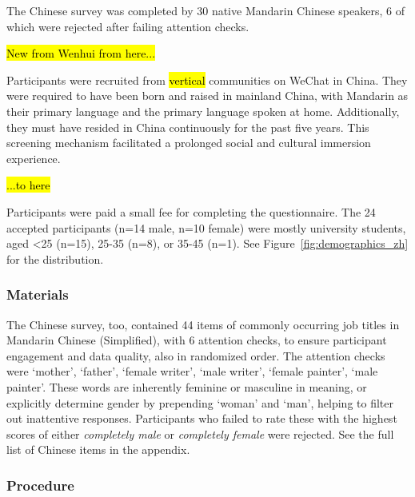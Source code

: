 \documentclass[11pt]{article}
\newcommand{\zh}[1]{\simplifiedchinesefont{#1}\rmfamily}
\begin{document}
The Chinese survey was completed by 30 native Mandarin Chinese speakers, 6 of which were rejected after failing attention checks. 

\hl{New from Wenhui from here...}

Participants were recruited from \hl{vertical} communities on WeChat in China.  They were required to have been born and raised in mainland China, with Mandarin as their primary language and the primary language spoken at home. Additionally, they must have resided in China continuously for the past five years.  This screening mechanism facilitated a prolonged social and cultural immersion experience.

\hl{...to here}

Participants were paid a small fee for completing the questionnaire. The 24 accepted participants (n=14 male, n=10 female) were mostly university students, aged <25 (n=15), 25-35 (n=8), or 35-45 (n=1). See Figure~\ref{fig:demographics_zh} for the distribution.

\subsubsection{Materials}

The Chinese survey, too, contained 44 items of commonly occurring job titles in Mandarin Chinese (Simplified), with 6 attention checks, to ensure participant engagement and data quality, also in randomized order. The attention checks were \zh{妈妈} `mother', \zh{爸爸} `father', \zh{女作家} `female writer', \zh{男作家} `male writer', \zh{女画家} `female painter', \zh{男画家} `male painter'. These words are inherently feminine or masculine in meaning, or explicitly determine gender by prepending \zh{女} `woman' and \zh{男} `man', helping to filter out inattentive responses. Participants who failed to rate these with the highest scores of either \textit{completely male} or \textit{completely female} were rejected. See the full list of Chinese items in the appendix. 

\subsubsection{Procedure}
\end{document}
